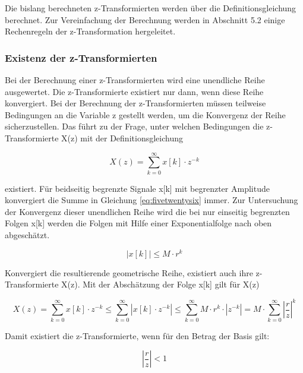 \noindent Die bislang berechneten z-Transformierten werden \"{u}ber die Definitionsgleichung berechnet. Zur Vereinfachung der Berechnung werden in Abschnitt 5.2 einige Rechenregeln der z-Transformation hergeleitet. 

\subsubsection{Existenz der z-Transformierten}

\noindent Bei der Berechnung einer z-Transformierten wird eine unendliche Reihe ausgewertet. Die z-Transformierte existiert nur dann, wenn diese Reihe konvergiert. Bei der Berechnung der z-Transformierten m\"{u}ssen teilweise Bedingungen an die Variable z gestellt werden, um die Konvergenz der Reihe sicherzustellen. Das f\"{u}hrt zu der Frage, unter welchen Bedingungen die z-Transformierte X(z) mit der Definitionsgleichung

\begin{equation}\label{eq:fivetwentysix}
X\left(z\right)=\sum _{k=0}^{\infty }x\left[k\right]\cdot z^{-k}
\end{equation}

\noindent existiert. F\"{u}r beidseitig begrenzte Signale x[k] mit begrenzter Amplitude konvergiert die Summe in Gleichung \eqref{eq:fivetwentysix} immer. Zur Untersuchung der Konvergenz dieser unendlichen Reihe wird die bei nur einseitig begrenzten Folgen x[k] werden die Folgen mit Hilfe einer Exponentialfolge nach oben abgesch\"{a}tzt. 

\begin{equation}\label{eq:fivetwentyseven}
\left|x\left[k\right]\right|\le M\cdot r^{k}
\end{equation}

\noindent Konvergiert die resultierende geometrische Reihe, existiert auch ihre z-Transformierte X(z). Mit der Absch\"{a}tzung der Folge x[k] gilt f\"{u}r X(z)

\begin{equation}\label{eq:fivetwentyeight}
X\left(z\right)=\sum _{k=0}^{\infty }x\left[k\right]\cdot z^{-k}  \le \sum _{k=0}^{\infty }\left|x\left[k\right]\cdot z^{-k} \right| \le \sum _{k=0}^{\infty }M\cdot r^{k} \cdot \left|z^{-k} \right| =M\cdot \sum _{k=0}^{\infty }\left|\frac{r}{z} \right|^{k}
\end{equation}

\noindent Damit existiert die z-Transformierte, wenn f\"{u}r den Betrag der Basis gilt:

\begin{equation}\label{eq:fivetwentynine}
\left|\frac{r}{z} \right|<1
\end{equation}

